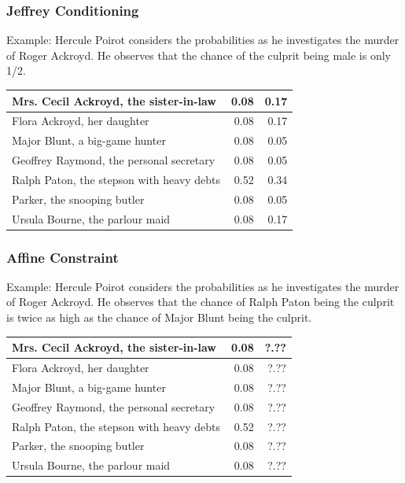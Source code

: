 \documentclass[xcolor=dvipsnames]{beamer}
\begin{document}
\begin{frame}
  \frametitle{Jeffrey Conditioning}
  Example: Hercule Poirot considers the probabilities as he
  investigates the murder of Roger Ackroyd. He observes that the
  chance of the culprit being male is only 1/2.

\mbox{}

\mbox{}

  \begin{tabular}{|l|r|r|} \hline
    Mrs. Cecil Ackroyd, the sister-in-law & 0.08 & 0.17 \\ \hline
    Flora Ackroyd, her daughter & 0.08 & 0.17 \\ \hline
    Major Blunt, a big-game hunter & 0.08 & 0.05 \\ \hline
    Geoffrey Raymond, the personal secretary & 0.08 & 0.05 \\ \hline
    Ralph Paton, the stepson with heavy debts & 0.52 & 0.34 \\ \hline
    Parker, the snooping butler & 0.08 & 0.05 \\ \hline
    Ursula Bourne, the parlour maid & 0.08 & 0.17 \\ \hline
  \end{tabular}
\end{frame}

\begin{frame}
  \frametitle{Affine Constraint}
  Example: Hercule Poirot considers the probabilities as he
  investigates the murder of Roger Ackroyd. He observes that the
  chance of Ralph Paton being the culprit is twice as high as the
  chance of Major Blunt being the culprit.

\mbox{}

  \begin{tabular}{|l|r|r|} \hline
    Mrs. Cecil Ackroyd, the sister-in-law & 0.08 & ?.?? \\ \hline
    Flora Ackroyd, her daughter & 0.08 & ?.?? \\ \hline
    Major Blunt, a big-game hunter & 0.08 & ?.?? \\ \hline
    Geoffrey Raymond, the personal secretary & 0.08 & ?.?? \\ \hline
    Ralph Paton, the stepson with heavy debts & 0.52 & ?.?? \\ \hline
    Parker, the snooping butler & 0.08 & ?.?? \\ \hline
    Ursula Bourne, the parlour maid & 0.08 & ?.?? \\ \hline
  \end{tabular}
\end{frame}
\end{document}
